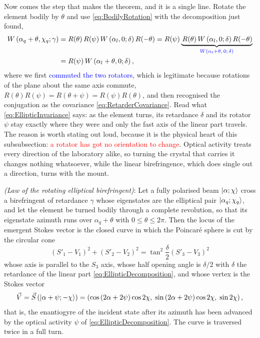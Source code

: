             Now comes the step that makes the theorem, and it is a single line. Rotate the element bodily by $\theta$ and use \ref{eq:BodilyRotation} with the decomposition just found,
            \begin{align}
                W\left(\alpha_q+\theta,\chi_q;\gamma\right) &= R(\theta)\,R(\psi)\,W\left(\alpha_l,0;\delta\right)R(-\theta) = R(\psi)\underbrace{\,R(\theta)\,W\left(\alpha_l,0;\delta\right)R(-\theta)}_{\textcolor{blue}{W\left(\alpha_l+\theta,\,0;\,\delta\right)}} \nonumber \\
                &= R(\psi)\,W\left(\alpha_l+\theta,0;\delta\right), \label{eq:EllipticInvariance}
            \end{align}
            where we first \textcolor{blue}{commuted the two rotators}, which is legitimate because rotations of the plane about the same axis commute, $R(\theta)R(\psi)=R(\theta+\psi)=R(\psi)R(\theta)$, and then recognised the conjugation as the covariance \ref{eq:RetarderCovariance}. Read what \ref{eq:EllipticInvariance} says: as the element turns, its retardance $\delta$ and its rotator $\psi$ stay exactly where they were and only the fast axis of the linear part travels. The reason is worth stating out loud, because it is the physical heart of this subsubsection: \textcolor{red}{a rotator has got no orientation to change}. Optical activity treats every direction of the laboratory alike, so turning the crystal that carries it changes nothing whatsoever, while the linear birefringence, which does single out a direction, turns with the mount.

            \begin{myteo}
                \textit{(Law of the rotating elliptical birefringent)}: Let a fully polarised beam $\ket{\alpha;\chi}$ cross a birefringent of retardance $\gamma$ whose eigenstates are the elliptical pair $\ket{\alpha_q;\chi_q}$, and let the element be turned bodily through a complete revolution, so that its eigenstate azimuth runs over $\alpha_q+\theta$ with $0\leq\theta\leq2\pi$. Then the locus of the emergent Stokes vector is the closed curve in which the Poincaré sphere is cut by the circular cone
                \begin{equation}\label{eq:EllipticCone}
                    \boxed{\;\left(S'_1-V_1\right)^2+\left(S'_2-V_2\right)^2 = \tan^2\frac{\delta}{2}\left(S'_3-V_3\right)^2\;}
                \end{equation}
                whose axis is parallel to the $S_3$ axis, whose half opening angle is $\delta/2$ with $\delta$ the retardance of the linear part \ref{eq:EllipticDecomposition}, and whose vertex is the Stokes vector
                \begin{equation}\label{eq:CrossState}
                    \vec{V} = \vec{S}\left(\ket{\alpha+\psi;-\chi}\right) = \left(\cos\left(2\alpha+2\psi\right)\cos2\chi,\;\sin\left(2\alpha+2\psi\right)\cos2\chi,\;\sin2\chi\right),
                \end{equation}
                that is, the enantiogyre of the incident state after its azimuth has been advanced by the optical activity $\psi$ of \ref{eq:EllipticDecomposition}. The curve is traversed twice in a full turn.
            \end{myteo}

